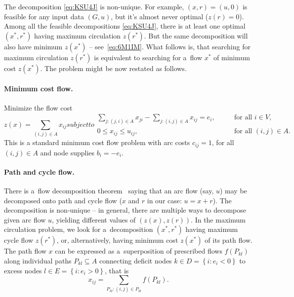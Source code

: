 \documentclass[paper=a4,parskip=half,DIV=12]{leetcode}
\begin{document}
The decomposition \eqref{eq:KSU4J} is non-unique. For example, $(x, r) = (u, 0)$
is feasible for any input data $(G,u)$, but it's almost never optimal ($z(r) = 0$).
Among all the feasible decompositions \eqref{eq:KSU4J}, there is at least one
optimal $(x^{*}, r^{*})$ having maximum circulation $z(r^{*})$. But the same
decomposition will also have minimum $z(x^{*})$ -- see~\eqref{eq:6M1IM}. What
follows is, that searching for maximum circulation $z(r^{*})$ is equivalent to
searching for a~flow $x^{*}$ of minimum cost $z(x^{*})$. The problem might be
now restated as follows.

\paragraph{Minimum cost flow.} Minimize the flow cost
\begin{subequations}
  \begin{equation}
    z(x) = \sum_{(i,j) \in A}{x_{ij}}
    \label{eq:0NZPS}
  \end{equation}
  subject to
  \begin{align}
    \sum_{j: (j,i) \in A}{x_{ji}} - \sum_{j: (i,j) \in A}{x_{ij}} = e_i, &
    && \text{ for all } i \in V, &&
    \label{eq:NMX02}
    \\
    0 \le x_{ij} \le u_{ij}, &
    && \text{ for all } (i,j) \in A. &&
    \label{eq:O0QTB}
  \end{align}
  \label{eq:A20W8}
\end{subequations}
This is a standard minimum cost flow problem with arc costs $c_{ij} = 1$, for
all $(i,j) \in A$ and node supplies $b_i = -e_i$.

\paragraph{Path and cycle flow.} There is a~flow decomposition
theorem~\cite{ahuja1993network} saying that an arc flow (say, $u$)
may be decomposed onto path and cycle flow ($x$ and $r$ in our case: $u = x + r$).
The decomposition is non-unique -- in general, there are multiple ways to
decompose given arc flow $u$, yielding different values of $(z(x), z(r))$. In
the maximum circulation problem, we look for a~decomposition $(x^{*},r^{*})$
having maximum cycle flow $z(r^{*})$, or, alternatively, having minimum cost
$z(x^{*})$ of its path flow. The path flow $x$ can be expressed as
a~superposition of prescribed flows $f(P_{kl})$ along individual paths $P_{kl}
\subseteq A$ connecting deficit nodes $k \in D = \left\lbrace i: e_i < 0
\right\rbrace$ to excess nodes $l \in E = \left\lbrace i: e_i > 0\right\rbrace$,
that is
\begin{equation}
  x_{ij} = \sum_{P_{kl}: (i,j) \in P_{kl}}{f(P_{kl})}.
  \label{eq:AIKU9}
\end{equation}
\end{document}
